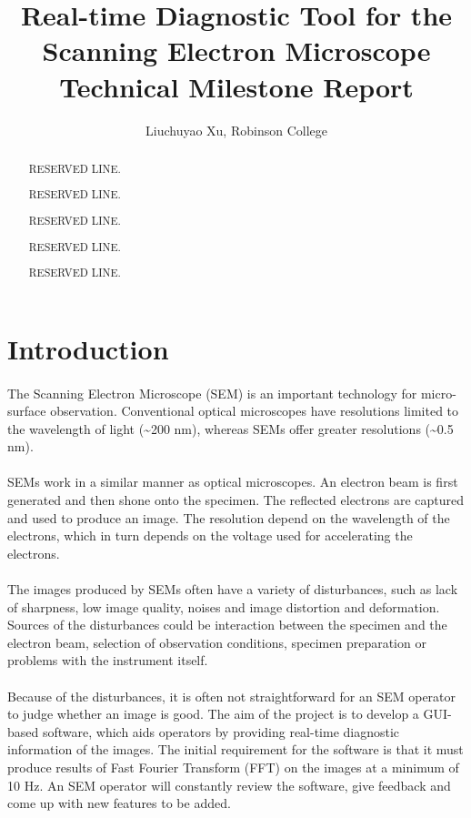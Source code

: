 \documentclass[12pt,a4paper]{article}
\title{Real-time Diagnostic Tool for the Scanning Electron Microscope Technical Milestone Report}
\author{Liuchuyao Xu, Robinson College}
\affil{Supervisor: Dr David Holburn}
\begin{document}
\maketitle

\begin{abstract}
RESERVED LINE.

RESERVED LINE.

RESERVED LINE.

RESERVED LINE.

RESERVED LINE.
\end{abstract}

\section{Introduction}
\paragraph{}
The Scanning Electron Microscope (SEM) is an important technology for micro-surface observation. Conventional optical microscopes have resolutions limited to the wavelength of light (\textasciitilde 200 nm), whereas SEMs offer greater resolutions (\textasciitilde 0.5 nm).

\paragraph{}
SEMs work in a similar manner as optical microscopes. An electron beam is first generated and then shone onto the specimen. The reflected electrons are captured and used to produce an image. The resolution depend on the wavelength of the electrons, which in turn depends on the voltage used for accelerating the electrons.

\paragraph{}
The images produced by SEMs often have a variety of disturbances, such as lack of sharpness, low image quality, noises and image distortion and deformation. Sources of the disturbances could be interaction between the specimen and the electron beam, selection of observation conditions, specimen preparation or problems with the instrument itself.

\paragraph{}
Because of the disturbances, it is often not straightforward for an SEM operator to judge whether an image is good. The aim of the project is to develop a GUI-based software, which aids operators by providing real-time diagnostic information of the images. The initial requirement for the software is that it must produce results of Fast Fourier Transform (FFT) on the images at a minimum of 10 Hz. An SEM operator will constantly review the software, give feedback and come up with new features to be added.
\end{document}
